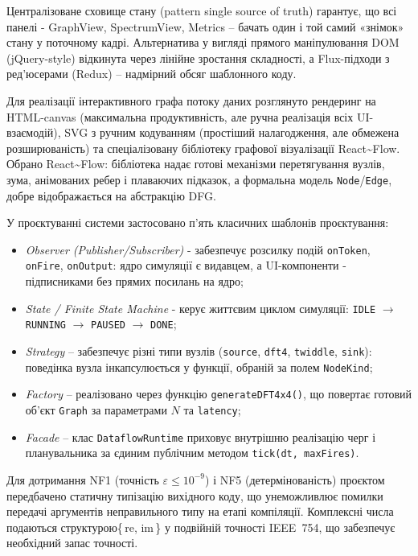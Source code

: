 \documentclass[
]{article}
\begin{document}
Централізоване сховище стану (pattern single source of truth) гарантує,
що всі панелі - GraphView, SpectrumView, Metrics -- бачать один і той
самий «знімок» стану у поточному кадрі. Альтернатива у вигляді прямого
маніпулювання DOM (jQuery-style) відкинута через лінійне зростання
складності, а Flux-підходи з ред'юсерами (Redux) -- надмірний обсяг
шаблонного коду.

Для реалізації інтерактивного графа потоку даних розглянуто рендеринг на
HTML-canvas (максимальна продуктивність, але ручна реалізація всіх
UI-взаємодій), SVG з ручним кодуванням (простіший налагодження, але
обмежена розширюваність) та спеціалізовану бібліотеку графової
візуалізації React\textasciitilde Flow. Обрано
React\textasciitilde Flow: бібліотека надає готові механізми
перетягування вузлів, зума, анімованих ребер і плаваючих підказок, а
формальна модель \texttt{Node}/\texttt{Edge}, добре відображається на
абстракцію DFG.

У проєктуванні системи застосовано п'ять класичних шаблонів
проєктування:

\begin{itemize}
\item
  \emph{Observer (Publisher/Subscriber)} - забезпечує розсилку подій
  \texttt{onToken}, \texttt{onFire}, \texttt{onOutput}: ядро симуляції є
  видавцем, а UI-компоненти - підписниками без прямих посилань на ядро;
\item
  \emph{State / Finite State Machine} - керує життєвим циклом симуляції:
  \texttt{IDLE} \(\rightarrow\) \texttt{RUNNING} \(\rightarrow\)
  \texttt{PAUSED} \(\rightarrow\) \texttt{DONE};
\item
  \emph{Strategy} -- забезпечує різні типи вузлів (\texttt{source},
  \texttt{dft4}, \texttt{twiddle}, \texttt{sink}): поведінка вузла
  інкапсулюється у функції, обраній за полем \texttt{NodeKind};
\item
  \emph{Factory} -- реалізовано через функцію \texttt{generateDFT4x4()},
  що повертає готовий об'єкт \texttt{Graph} за параметрами \(N\) та
  \texttt{latency};
\item
  \emph{Facade} -- клас \texttt{DataflowRuntime} приховує внутрішню
  реалізацію черг і планувальника за єдиним публічним методом
  \texttt{tick}\texttt{(}\texttt{dt}\texttt{,\ }\texttt{maxFires}\texttt{)}.
\end{itemize}

Для дотримання NF1 (точність \(\varepsilon \leq 10^{- 9}\)) і NF5
(детермінованість) проєктом передбачено статичну типізацію вихідного
коду, що унеможливлює помилки передачі аргументів неправильного типу на
етапі компіляції. Комплексні числа подаються структурою\{ re, im \} у
подвійній точності IEEE~754, що забезпечує необхідний запас точності.
\end{document}
